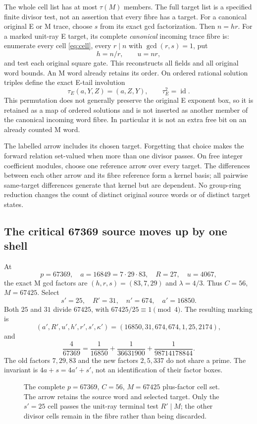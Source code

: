 The whole cell list has at most $\tau(M)$ members. The full target list is a
specified finite divisor test, not an assertion that every fibre has a target.
For a canonical original E or M trace, choose $s$ from its exact gcd
factorization. Then $n=hr$. For a marked unit-ray E target, its complete
\emph{canonical} incoming trace fibre is: enumerate every cell
\eqref{eq:cell}, every $r\mid n$ with $\gcd(r,s)=1$, put
\[
 h=n/r,\qquad u=nr,
\]
and test each original square gate. This reconstructs all fields and all
original word bounds. An M word already retains its order. On ordered rational
solution triples define the exact E-tail involution
\[
 \tau_E(a,Y,Z)=(a,Z,Y),\qquad \tau_E^2=\operatorname{id}.
\]
This permutation does not generally preserve the original E exponent box, so it
is retained as a map of ordered solutions and is not inserted as another member
of the canonical incoming word fibre. In particular it is not an extra free
bit on an already counted M word.

The labelled arrow includes its chosen target. Forgetting that choice makes
the forward relation set-valued when more than one divisor passes. On free
integer coefficient modules, choose one reference arrow over every target. The
differences between each other arrow and its fibre reference form a kernel basis;
all pairwise same-target differences generate that kernel but are dependent.
No group-ring reduction changes the count
of distinct original source words or of distinct target states.

\subsection{The critical 67369 source moves up by one shell}
At
\[
 p=67369,\quad a=16849=7\cdot29\cdot83,\quad R=27,\quad u=4067,
\]
the exact M gcd factors are $(h,r,s)=(83,7,29)$ and $\lambda=4/3$.
Thus $C=56$, $M=67425$. Select
\[
 s'=25,\quad R'=31,\quad n'=674,\quad a'=16850.
\]
Both $25$ and $31$ divide $67425$, with $67425/25\equiv1\pmod4$.
The resulting marking is
\[
 (a',R',u',h',r',s',\kappa')=(16850,31,674,674,1,25,2174),
\]
and
\begin{equation}\label{eq:critical}
 \frac4{67369}=\frac1{16850}+\frac1{36631900}+\frac1{98714178844}.
\end{equation}
The old factors $7,29,83$ and the new factors $2,5,337$ do not share a prime.
The invariant is $4a+s=4a'+s'$, not an identification of their factor boxes.

\begin{figure}[ht]
\centering

\caption{The complete $p=67369$, $C=56$, $M=67425$ plus-factor cell set.
The arrow retains the source word and selected target. Only the $s'=25$ cell
passes the unit-ray terminal test $R'\mid M$; the other divisor cells remain in
the fibre rather than being discarded.}
\label{fig:plus-fibre}
\end{figure}

